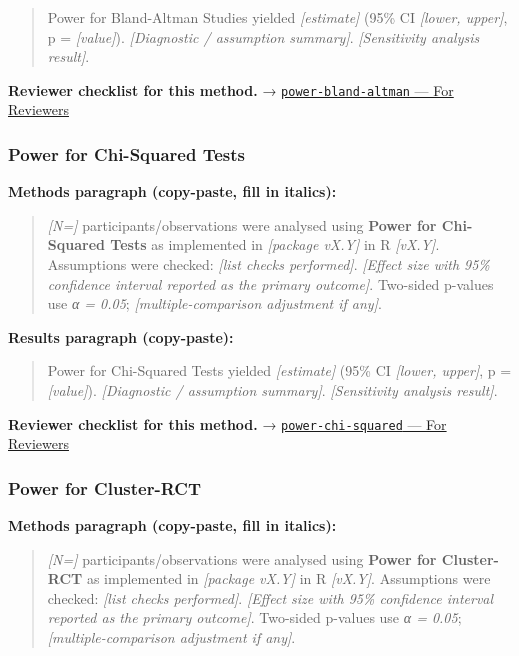 \documentclass[
]{article}
\begin{document}
\begin{quote}
Power for Bland-Altman Studies yielded \emph{{[}estimate{]}} (95\% CI
\emph{{[}lower, upper{]}}, p = \emph{{[}value{]}}). \emph{{[}Diagnostic
/ assumption summary{]}}. \emph{{[}Sensitivity analysis result{]}}.
\end{quote}

\textbf{Reviewer checklist for this method.} →
\href{../chapters/05-power/power-bland-altman.Rmd\#for-reviewers}{\texttt{power-bland-altman}
--- For Reviewers}

\subsubsection{Power for Chi-Squared
Tests}\label{power-for-chi-squared-tests}

\textbf{Methods paragraph (copy-paste, fill in italics):}

\begin{quote}
\emph{{[}N={]}} participants/observations were analysed using
\textbf{Power for Chi-Squared Tests} as implemented in \emph{{[}package
vX.Y{]}} in R \emph{{[}vX.Y{]}}. Assumptions were checked: \emph{{[}list
checks performed{]}}. \emph{{[}Effect size with 95\% confidence interval
reported as the primary outcome{]}}. Two-sided p-values use \emph{α =
0.05}; \emph{{[}multiple-comparison adjustment if any{]}}.
\end{quote}

\textbf{Results paragraph (copy-paste):}

\begin{quote}
Power for Chi-Squared Tests yielded \emph{{[}estimate{]}} (95\% CI
\emph{{[}lower, upper{]}}, p = \emph{{[}value{]}}). \emph{{[}Diagnostic
/ assumption summary{]}}. \emph{{[}Sensitivity analysis result{]}}.
\end{quote}

\textbf{Reviewer checklist for this method.} →
\href{../chapters/05-power/power-chi-squared.Rmd\#for-reviewers}{\texttt{power-chi-squared}
--- For Reviewers}

\subsubsection{Power for Cluster-RCT}\label{power-for-cluster-rct}

\textbf{Methods paragraph (copy-paste, fill in italics):}

\begin{quote}
\emph{{[}N={]}} participants/observations were analysed using
\textbf{Power for Cluster-RCT} as implemented in \emph{{[}package
vX.Y{]}} in R \emph{{[}vX.Y{]}}. Assumptions were checked: \emph{{[}list
checks performed{]}}. \emph{{[}Effect size with 95\% confidence interval
reported as the primary outcome{]}}. Two-sided p-values use \emph{α =
0.05}; \emph{{[}multiple-comparison adjustment if any{]}}.
\end{quote}
\end{document}
